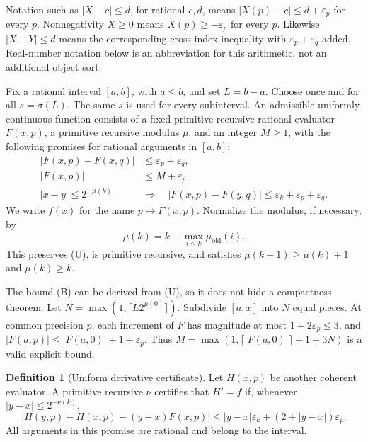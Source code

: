 \documentclass[11pt]{article}
\theoremstyle{definition}
\newtheorem{definition}[theorem]{Definition}
\newcommand{\eps}{\varepsilon}
\newcommand{\abs}[1]{\left|#1\right|}
\begin{document}
Notation such as \(\abs{X-c}\le d\), for rational \(c,d\), means
\(\abs{X(p)-c}\le d+\eps_p\) for every \(p\).
Nonnegativity \(X\ge0\) means \(X(p)\ge-\eps_p\) for every \(p\).
Likewise \(\abs{X-Y}\le d\) means the corresponding cross-index
inequality with \(\eps_p+\eps_q\) added.  Real-number notation below
is an abbreviation for this arithmetic, not an additional object sort.

Fix a rational interval \([a,b]\), with \(a\le b\), and set \(L=b-a\).
Choose once and for all \(s=\sigma(L)\).  The same \(s\) is used for
every subinterval.  An admissible uniformly continuous function consists
of a fixed primitive recursive rational evaluator \(F(x,p)\), a
primitive recursive modulus \(\mu\), and an integer \(M\ge1\), with
the following promises for rational arguments in \([a,b]\):
\begin{align}
 \abs{F(x,p)-F(x,q)}&\le\eps_p+\eps_q,\tag{C}\label{eq:C}\\
 \abs{F(x,p)}&\le M+\eps_p,\tag{B}\label{eq:B}\\
 \abs{x-y}\le2^{-\mu(k)}\quad&\Longrightarrow\quad
 \abs{F(x,p)-F(y,q)}\le\eps_k+\eps_p+\eps_q.\tag{U}\label{eq:U}
\end{align}
We write \(f(x)\) for the name \(p\mapsto F(x,p)\).  Normalize the
modulus, if necessary, by
\begin{equation}
 \mu(k)=k+\max_{i\le k}\mu_{\mathrm{old}}(i).\label{eq:munormal}
\end{equation}
This preserves (U), is primitive recursive, and satisfies
\(\mu(k+1)\ge\mu(k)+1\) and \(\mu(k)\ge k\).

The bound (B) can be derived from (U), so it does not hide a compactness
theorem.  Let \(N=\max(1,\lceil L2^{\mu(0)}\rceil)\).  Subdivide
\([a,x]\) into \(N\) equal pieces.  At common precision \(p\), each
increment of \(F\) has magnitude at most \(1+2\eps_p\le3\), and
\(\abs{F(a,p)}\le\abs{F(a,0)}+1+\eps_p\).  Thus
\(M=\max(1,\lceil\abs{F(a,0)}\rceil+1+3N)\) is a valid explicit bound.

\begin{definition}[Uniform derivative certificate]\label{def:derivative}
Let \(H(x,p)\) be another coherent evaluator.  A primitive recursive
\(\nu\) certifies that \(H'=f\) if, whenever
\(\abs{y-x}\le2^{-\nu(k)}\),
\begin{equation}
 \abs{H(y,p)-H(x,p)-(y-x)F(x,p)}
 \le\abs{y-x}\eps_k+(2+\abs{y-x})\eps_p.\tag{D}\label{eq:D}
\end{equation}
All arguments in this promise are rational and belong to the interval.
\end{definition}
\end{document}
